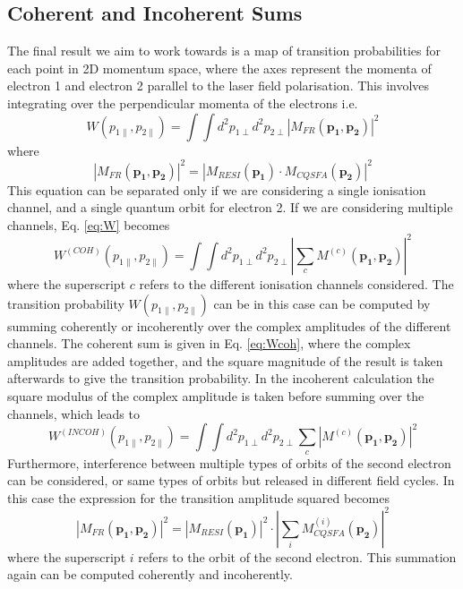 \documentclass[11pt]{article}
\numberwithin{equation}{section}
\begin{document}
\subsection{Coherent and Incoherent Sums}
The final result we aim to work towards is a map of transition probabilities for each point in 2D momentum space, where the axes represent the momenta of electron 1 and electron 2 parallel to the laser field polarisation. This involves integrating over the perpendicular momenta of the electrons i.e.
\begin{equation}\label{eq:W}
    W(p_{1\parallel}, p_{2\parallel}) = \int \int d^2p_{1\perp} d^2p_{2\perp}\left | M_{FR}(\mathbf{p_1}, \mathbf{p_2}) \right |^2
\end{equation}
where
\begin{equation} \label{eq:MFR}
    \left |M_{FR}(\mathbf{p_1}, \mathbf{p_2})\right |^2 =\left | M_{RESI}(\mathbf{p_1}) \cdot M_{CQSFA}(\mathbf{p_2}) \right |^2
\end{equation}
This equation can be separated only if we are considering a single ionisation channel, and a single quantum orbit for electron 2. If we are considering multiple channels, Eq. \ref{eq:W} becomes 
\begin{equation}\label{eq:Wcoh}
    W^{(COH)}(p_{1\parallel}, p_{2\parallel}) = \int \int d^2p_{1\perp} d^2p_{2\perp}\left | \sum_c M^{(c)}(\mathbf{p_1}, \mathbf{p_2}) \right |^2
\end{equation}
where the superscript $c$ refers to the different ionisation channels considered.
The transition probability $ W(p_{1\parallel}, p_{2\parallel})$ can be in this case can be computed by summing coherently or incoherently over the complex amplitudes of the different channels. The coherent sum is given in Eq. \ref{eq:Wcoh}, where the complex amplitudes are added together, and the square magnitude of the result is taken afterwards to give the transition probability. In the incoherent calculation the square modulus of the complex amplitude is taken before summing over the channels, which leads to
\begin{equation}
    W^{(INCOH)}(p_{1\parallel}, p_{2\parallel}) = \int \int d^2p_{1\perp} d^2p_{2\perp} \sum_c \left | M^{(c)}(\mathbf{p_1}, \mathbf{p_2}) \right |^2
\end{equation}
Furthermore, interference between multiple types of orbits of the second electron can be considered, or same types of orbits but released in different field cycles. In this case the expression for the transition amplitude squared becomes 
\begin{equation} \label{eq:Mfr}
    \left |M_{FR}(\mathbf{p_1}, \mathbf{p_2})\right |^2 =\left | M_{RESI}(\mathbf{p_1}) \right | ^2 \cdot \left | \sum_i M_{CQSFA}^{(i)}(\mathbf{p_2}) \right |^2
\end{equation}
where the superscript $i$ refers to the orbit of the second electron. This summation again can be computed coherently and incoherently. 
\end{document}
